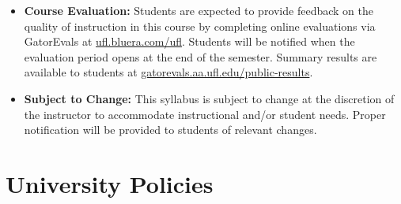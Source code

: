 \documentclass[11pt]{article}
\begin{document}
\begin{itemize}
	\item \textbf{Course Evaluation:} Students are expected to provide feedback on the quality of instruction in this course by completing online evaluations via GatorEvals at {\href{https://ufl.bluera.com/ufl/}{ufl.bluera.com/ufl}}. Students will be notified when the evaluation period opens at the end of the semester. Summary results are available to students at {\href{https://gatorevals.aa.ufl.edu/public-results/}{gatorevals.aa.ufl.edu/public-results}}.
	\item \textbf{Subject to Change:} This syllabus is subject to change at the discretion of the instructor to accommodate instructional and/or student needs. Proper notification will be provided to students of relevant changes.
	\end{itemize}

\section{University Policies}
\end{document}
